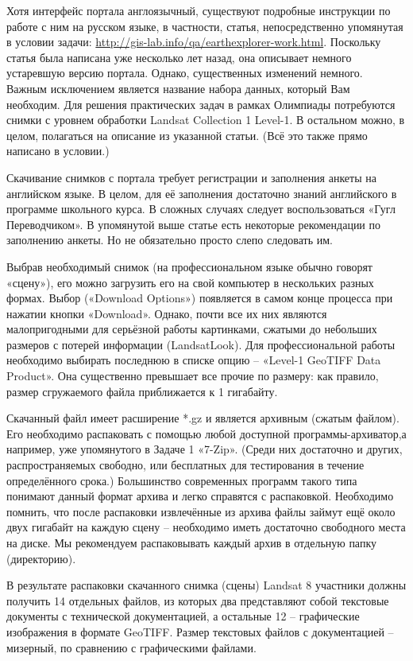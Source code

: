 Хотя интерфейс портала англоязычный, существуют подробные инструкции по работе с ним на русском языке, в частности, статья, непосредственно упомянутая в условии задачи: \url{http://gis-lab.info/qa/earthexplorer-work.html}. Поскольку статья была написана уже несколько лет назад, она описывает немного устаревшую версию портала. Однако, существенных изменений немного. Важным исключением является название набора данных, который Вам необходим. Для решения практических задач в рамках Олимпиады потребуются снимки с уровнем обработки Landsat Collection 1 Level-1. В остальном можно, в целом, полагаться на описание из указанной статьи. (Всё это также прямо написано в условии.)

Скачивание снимков с портала требует регистрации и заполнения анкеты на английском языке. В целом, для её заполнения достаточно знаний английского в программе школьного курса. В сложных случаях следует воспользоваться «Гугл Переводчиком». В упомянутой выше статье есть некоторые рекомендации по заполнению анкеты. Но не обязательно просто слепо следовать им.

Выбрав необходимый снимок (на профессиональном языке обычно говорят «сцену»), его можно загрузить его на свой компьютер в нескольких разных формах. Выбор («Download Options») появляется в самом конце процесса при нажатии кнопки «Download». Однако, почти все их них являются малопригодными для серьёзной работы картинками, сжатыми до небольших размеров с потерей информации (LandsatLook). Для профессиональной работы необходимо выбирать последнюю в списке опцию – «Level-1 GeoTIFF Data Product». Она существенно превышает все прочие по размеру: как правило, размер сгружаемого файла приближается к 1 гигабайту.

Скачанный файл имеет расширение *.gz и является архивным (сжатым файлом). Его необходимо распаковать с помощью любой доступной программы-архиватор,а например, уже упомянутого в Задаче 1 «7-Zip». (Среди них достаточно и других, распространяемых свободно, или бесплатных для тестирования в течение определённого срока.) Большинство современных программ такого типа понимают данный формат архива и легко справятся с распаковкой. Необходимо помнить, что после распаковки извлечённые из архива файлы займут ещё около двух гигабайт на каждую сцену – необходимо иметь достаточно свободного места на диске. Мы рекомендуем распаковывать каждый архив в отдельную папку (директорию).

В результате распаковки скачанного снимка (сцены) Landsat 8 участники должны получить 14 отдельных файлов, из которых два представляют собой текстовые документы с технической документацией, а остальные 12 – графические изображения в формате GeoTIFF. Размер текстовых файлов с документацией – мизерный, по сравнению с графическими файлами.

